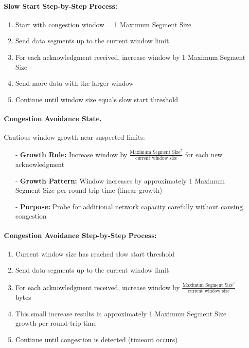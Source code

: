 \documentclass[../../compsys.tex]{subfiles}
\begin{document}
\paragraph{Slow Start Step-by-Step Process:}
\begin{enumerate}
  \item Start with congestion window = 1 Maximum Segment Size
  \item Send data segments up to the current window limit
  \item For each acknowledgment received, increase window by 1 Maximum Segment Size
  \item Send more data with the larger window
  \item Continue until window size equals slow start threshold
\end{enumerate}

\paragraph{Congestion Avoidance State.} Cautious window growth near suspected limits:
\begin{itemize}
  \item[-] \textbf{Growth Rule:} Increase window by $\frac{\text{Maximum Segment Size}^2}{\text{current window size}}$ for each new acknowledgment
  \item[-] \textbf{Growth Pattern:} Window increases by approximately 1 Maximum Segment Size per round-trip time (linear growth)
  \item[-] \textbf{Purpose:} Probe for additional network capacity carefully without causing congestion
\end{itemize}

\paragraph{Congestion Avoidance Step-by-Step Process:}
\begin{enumerate}
  \item Current window size has reached slow start threshold
  \item Send data segments up to the current window limit
  \item For each acknowledgment received, increase window by $\frac{\text{Maximum Segment Size}^2}{\text{current window size}}$ bytes
  \item This small increase results in approximately 1 Maximum Segment Size growth per round-trip time
  \item Continue until congestion is detected (timeout occurs)
\end{enumerate}
\end{document}
